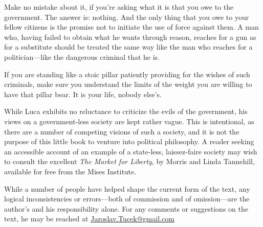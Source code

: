 Make no mistake about it, if you're asking what it is that you owe to the government. The answer is: nothing. And the only thing that you owe to your fellow citizens is the promise not to initiate the use of force against them. A man who, having failed to obtain what he wants through reason, reaches for a gun as for a substitute should be treated the same way like the man who reaches for a politician---like the dangerous criminal that he is.

If you are standing like a stoic pillar patiently providing for the wishes of such criminals, make sure you understand the limits of the weight you are willing to have that pillar bear. It is your life, nobody else's.

\sectionline

While Luca exhibits no reluctance to criticize the evils of the government, his views on a government-less society are kept rather vague. This is intentional, as there are a number of competing visions of such a society, and it is not the purpose of this little book to venture into political philosophy. A reader seeking an accessible account of an example of a state-less, laissez-faire society may wish to consult the excellent \emph{The Market for Liberty}, by Morris and Linda Tannehill, available for free from the Mises Institute.

\sectionline

While a number of people have helped shape the current form of the text, any logical inconsistencies or errors---both of commission and of omission---are the author's and his responsibility alone. For any comments or suggestions on the text, he may be reached at \href{mailto:Jaroslav.Tucek@gmail.com}{Jaroslav.Tucek@gmail.com}


